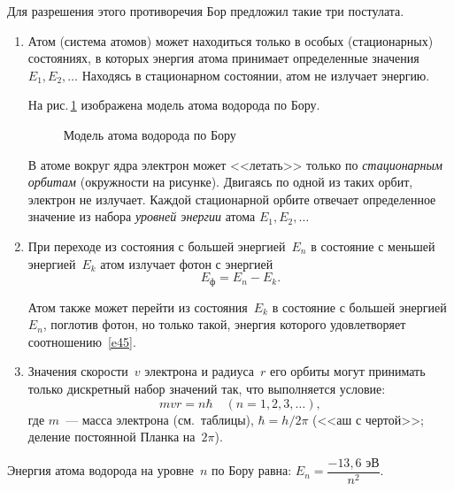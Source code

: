 \documentclass[main.tex]{subfiles}
\begin{document}
Для разрешения этого противоречия Бор предложил такие три постулата.
\begin{enumerate}
    \item [\textbf{I.}] Атом (система атомов) может находиться только в особых (стационарных) состояниях, в которых энергия атома принимает определенные значения $E_1, E_2,\ldots$ Находясь в стационарном состоянии, атом не излучает энергию.

    На рис.\,\ref{fig:p201} изображена модель атома водорода по Бору.
    
    \begin{figure}[H]
    \centering

\caption{Модель атома водорода по Бору}
\label{fig:p201}
\end{figure}
\nointerlineskip

    В атоме вокруг ядра электрон может <<летать>> только по \emph{стационарным орбитам} (окружности на рисунке). Двигаясь по одной из таких орбит, электрон не излучает. Каждой стационарной орбите отвечает определенное значение из набора \emph{уровней энергии} атома $E_1,E_2,\ldots$ 
    
    \item [\textbf{II.}] При переходе из состояния с большей энергией~$E_n$ в состояние с меньшей энергией~$E_k$ атом излучает фотон с энергией
    \begin{equation}
        \label{e45}
        E_\text{ф}=E_n-E_k.
    \end{equation}

    Атом также может перейти из состояния~$E_k$ в состояние с большей энергией~$E_n$, поглотив фотон, но только такой, энергия которого удовлетворяет соотношению~\eqref{e45}.

    \item [\textbf{III.}] Значения скорости~$v$ электрона и радиуса~$r$ его орбиты могут принимать только дискретный набор значений так, что выполняется условие:
    \begin{equation}
        mvr=n\hbar\quad (n=1,2,3,\ldots),
    \end{equation}
    где $m$~--- масса электрона (см.~таблицы), $\hbar=h/2\pi$ (<<аш с чертой>>; деление постоянной Планка на~$2\pi$). 
    
\end{enumerate}

Энергия атома водорода на уровне~$n$ по Бору равна: $E_n=\dfrac{-13{,}6\text{~эВ}}{n^2}$.














 
\end{document}
